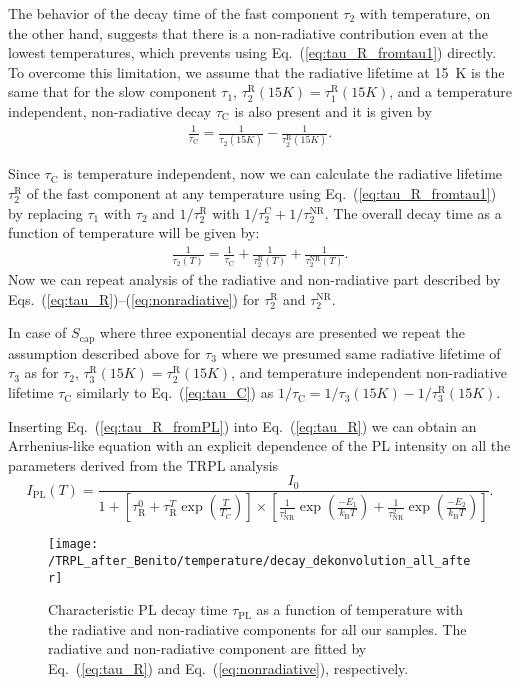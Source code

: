 The behavior of the decay time of the fast component $\tau_2$ with temperature, on the other hand, suggests that there is a non-radiative contribution even at the lowest temperatures, which prevents using Eq.~(\ref{eq:tau_R_fromtau1}) directly. To overcome this limitation, we assume that the radiative lifetime at 15~K is the same that for the slow component $\tau_1$, $\tau_2^\mathrm{R}(15K)=\tau_1^\mathrm{R}(15K)$, and a temperature independent, non-radiative decay $\tau_\mathrm{C}$ is also present and it is given by
%
\begin{eqnarray}
\frac{1}{\tau_\mathrm{C}}=\frac{1}{\tau_2(15K)}-\frac{1}{\tau_2^\mathrm{R}(15K)}.\label{eq:tau_C}
\end{eqnarray}

Since $\tau_\mathrm{C}$ is temperature independent, now we can calculate the radiative lifetime $\tau_2^\mathrm{R}$ of the fast component at any temperature using Eq.~(\ref{eq:tau_R_fromtau1}) by replacing $\tau_1$ with $\tau_2$ and $1/\tau_2^\mathrm{R}$ with $1/\tau_2^\mathrm{C}+1/\tau_2^\mathrm{NR}$. The overall decay time as a function of temperature will be given by:
\begin{eqnarray}
\frac{1}{\tau_2(T)}=\frac{1}{\tau_\mathrm{C}}+\frac{1}{\tau_2^\mathrm{R}(T)}+\frac{1}{\tau_2^\mathrm{NR}(T)}.
\end{eqnarray}
%
Now we can repeat analysis of the radiative and non-radiative part described by Eqs.~(\ref{eq:tau_R})--(\ref{eq:nonradiative}) for $\tau_2^\mathrm{R}$ and $\tau_2^\mathrm{NR}$.

In case of $S_\mathrm{cap}$ where three exponential decays are presented we repeat the assumption described above for $\tau_3$ where we presumed same radiative lifetime of $\tau_3$ as for $\tau_2$, $\tau_3^\mathrm{R}(15K)=\tau_2^\mathrm{R}(15K)$, and temperature independent non-radiative lifetime $\tau_\mathrm{C}$ similarly to Eq.~(\ref{eq:tau_C}) as $1 / \tau_\mathrm{C} = 1/ \tau_3(15K)-1/ \tau_3^\mathrm{R}(15K)$.

Inserting Eq.~(\ref{eq:tau_R_fromPL}) into Eq.~(\ref{eq:tau_R}) we can obtain an Arrhenius-like equation with an explicit dependence of the PL intensity on all the parameters derived from the TRPL analysis
%
\begin{equation}
I_\mathrm{PL}(T)=\frac{I_0}{1+\left[\tau_\mathrm{R}^0+\tau_\mathrm{R}^T\exp{\left(\frac{T}{T_C}\right)}\right] \times \left[\frac{1}{\tau_\mathrm{NR}^1}\exp{\left(\frac{-E_1}{k_\mathrm{B}T}\right)} + \frac{1}{\tau_\mathrm{NR}^2}\exp{\left(\frac{-E_2}{k_\mathrm{B}T}\right)}\right]}. \label{eq:TRPL_Arhenius}
\end{equation}
%
\begin{figure}
	\centering
	\texttt{[image: /TRPL\_after\_Benito/temperature/decay\_dekonvolution\_all\_after]}
	\caption{Characteristic PL decay time $\tau_\mathrm{PL}$ as a function of temperature with the radiative and non-radiative components for all our samples. The radiative and non-radiative component are fitted by Eq.~(\ref{eq:tau_R}) and Eq.~(\ref{eq:nonradiative}), respectively.}
	\label{fig:TRPL_temp_decon}
\end{figure}


